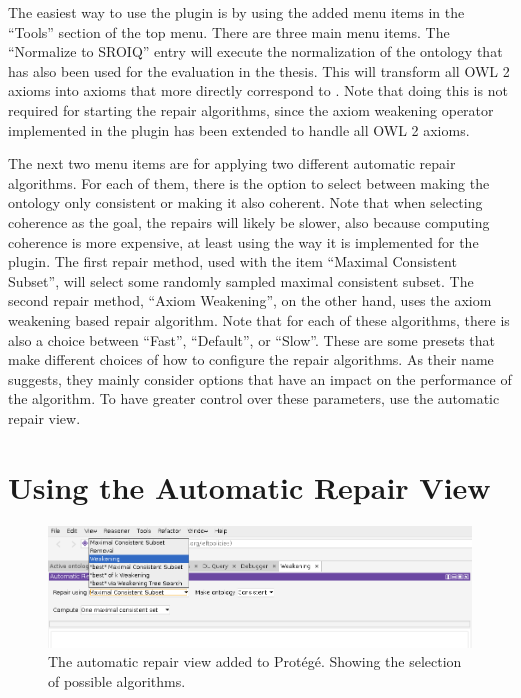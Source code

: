 The easiest way to use the plugin is by using the added menu items in the ``Tools'' section of the top menu. There are three main menu items. The ``Normalize to SROIQ'' entry will execute the normalization of the ontology that has also been used for the evaluation in the thesis. This will transform all OWL 2 axioms into axioms that more directly correspond to \SROIQ. Note that doing this is not required for starting the repair algorithms, since the axiom weakening operator implemented in the plugin has been extended to handle all OWL 2 axioms.

The next two menu items are for applying two different automatic repair algorithms. For each of them, there is the option to select between making the ontology only consistent or making it also coherent. Note that when selecting coherence as the goal, the repairs will likely be slower, also because computing coherence is more expensive, at least using the way it is implemented for the plugin. The first repair method, used with the item ``Maximal Consistent Subset'', will select some randomly sampled maximal consistent subset. The second repair method, ``Axiom Weakening'', on the other hand, uses the axiom weakening based repair algorithm. Note that for each of these algorithms, there is also a choice between ``Fast'', ``Default'', or ``Slow''. These are some presets that make different choices of how to configure the repair algorithms. As their name suggests, they mainly consider options that have an impact on the performance of the algorithm. To have greater control over these parameters, use the automatic repair view.

\section{Using the Automatic Repair View}

\begin{figure}[htbp]
  \centering
  \includegraphics[width=\textwidth]{resources/protege-guide-algorithms.png}
  \caption{The automatic repair view added to Protégé. Showing the selection of possible algorithms.}
\end{figure}

